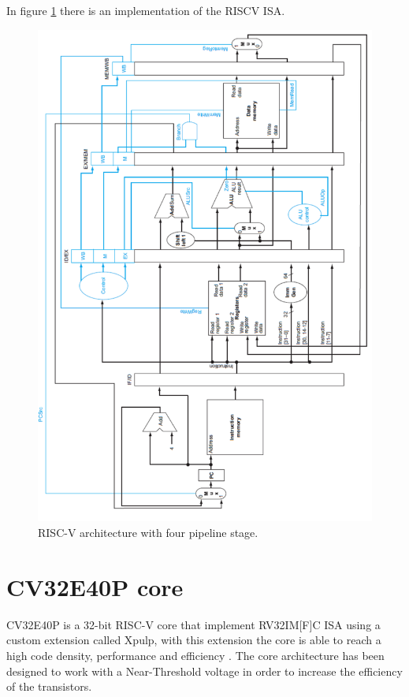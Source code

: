 {{		In figure \ref{fig:riscv_architecture1} there is an implementation of the RISCV ISA.
	    \begin{figure}[H]
			\centering
			\includegraphics[scale=0.4,center]{./images/RISCV_arch.png}
			\caption{RISC-V architecture with four pipeline stage.}
			\label{fig:riscv_architecture1}
		\end{figure}  
		
	}%
	
	\section{CV32E40P core}{
		CV32E40P is a 32-bit RISC-V core that implement RV32IM[F]C ISA using a custom extension called Xpulp, with this  extension the core is able to reach a high code density, performance and efficiency  . The core architecture has been designed to work with a Near-Threshold voltage in order to increase the efficiency of the transistors.\\ 
		
}}
